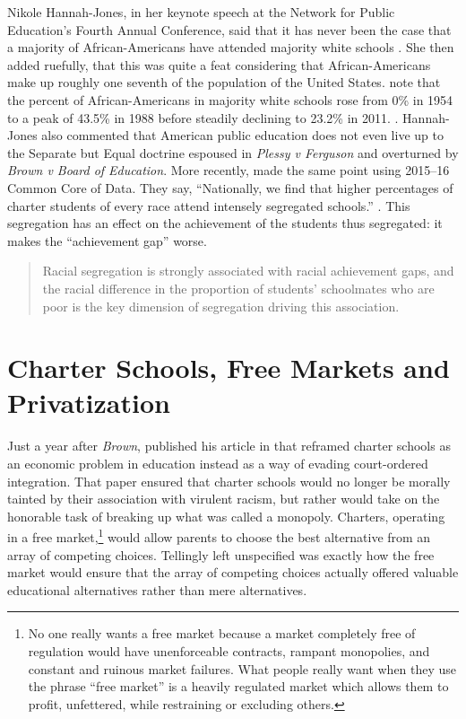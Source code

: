 Nikole Hannah-Jones, in her keynote speech at the Network for Public Education's Fourth Annual Conference, said that it has never been the case that a majority of African-Americans have attended majority white schools \parencite{Hannah-Jones2017}. She then added ruefully, that this was quite a feat considering that African-Americans make up roughly one seventh of the population of the United States. \citeauthor{Orfield.Frankenberg2014} note that the percent of African-Americans in majority white schools rose from 0\% in 1954 to a peak of 43.5\% in 1988 before steadily declining to 23.2\% in 2011. \parencite[Table 3: Percent of Black Students in Majority White Schools, 1954–2011,][10]{Orfield.Frankenberg2014}. Hannah-Jones also commented that American public education does not even live up to the Separate but Equal doctrine espoused in \textit{Plessy v Ferguson} and overturned by \textit{Brown v Board of Education}. More recently, \citeauthor{Heilig.etal2019a} made the same point using 2015--16 Common Core of Data. They say, ``Nationally, we find that higher percentages of charter students of every race attend intensely segregated schools.'' \parencite[205]{Heilig.etal2019a}. This segregation has an effect on the achievement of the students thus segregated: it makes the ``achievement gap'' worse. %

\begin{quote}\OnehalfSpacing%
  Racial segregation is strongly associated with racial achievement gaps, and the racial difference in the proportion of students’ schoolmates who are poor is the key dimension of segregation driving this association.\\ 
  \end{quote}

\section{Charter Schools, Free Markets  and Privatization}\label{sec:freemarkets}\indent

Just a year after \textit{Brown},  \textcite{Friedman1955} published his article  in  \parencite{Friedman1955} that reframed charter schools as an economic problem in education instead as a way of evading court-ordered integration. That paper ensured that charter schools would no longer be morally tainted by their association with virulent racism, but rather would take on the honorable task of breaking up what was called a monopoly. Charters, operating in a free market,\footnote{No one really wants a free market because a  market completely free of regulation would have unenforceable contracts, rampant monopolies, and constant and ruinous market failures. What people really want when they use the phrase ``free market'' is a heavily regulated market which allows them to profit, unfettered, while restraining or excluding others.} would allow parents to choose the best alternative from an array of competing choices. Tellingly left unspecified was exactly how the free market would ensure that the array of competing choices actually offered valuable educational alternatives rather than mere alternatives.

